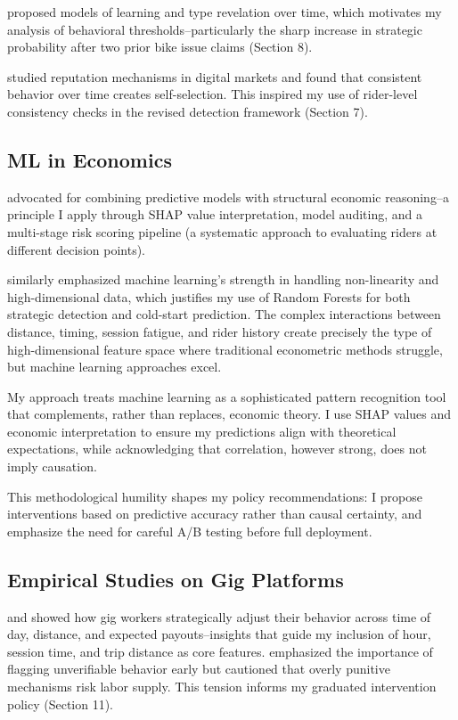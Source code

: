 \documentclass[12pt,letterpaper]{article}
\begin{document}
\citet{jovanovic1982selection} proposed models of learning and type revelation over time, which motivates my analysis of behavioral thresholds--particularly the sharp increase in strategic probability after two prior bike issue claims (Section 8).

\citet{cabral2010dynamics} studied reputation mechanisms in digital markets and found that consistent behavior over time creates self-selection. This inspired my use of rider-level consistency checks in the revised detection framework (Section 7).

\subsection{ML in Economics}

\citet{athey2019ml} advocated for combining predictive models with structural economic reasoning--a principle I apply through SHAP \citep{lundberg2017unified} value interpretation, model auditing, and a multi-stage risk scoring pipeline (a systematic approach to evaluating riders at different decision points).

\citet{mullainathan2017ml} similarly emphasized machine learning's strength in handling non-linearity and high-dimensional data, which justifies my use of Random Forests for both strategic detection and cold-start prediction. The complex interactions between distance, timing, session fatigue, and rider history create precisely the type of high-dimensional feature space where traditional econometric methods struggle, but machine learning approaches excel.

My approach treats machine learning as a sophisticated pattern recognition tool that complements, rather than replaces, economic theory. I use SHAP values and economic interpretation to ensure my predictions align with theoretical expectations, while acknowledging that correlation, however strong, does not imply causation.

This methodological humility shapes my policy recommendations: I propose interventions based on predictive accuracy rather than causal certainty, and emphasize the need for careful A/B testing before full deployment.

\subsection{Empirical Studies on Gig Platforms}

\citet{hall2019pricing} and \citet{cook2021gig} showed how gig workers strategically adjust their behavior across time of day, distance, and expected payouts--insights that guide my inclusion of hour, session time, and trip distance as core features. \citet{liu2023strategic} emphasized the importance of flagging unverifiable behavior early but cautioned that overly punitive mechanisms risk labor supply. This tension informs my graduated intervention policy (Section 11).
\end{document}
